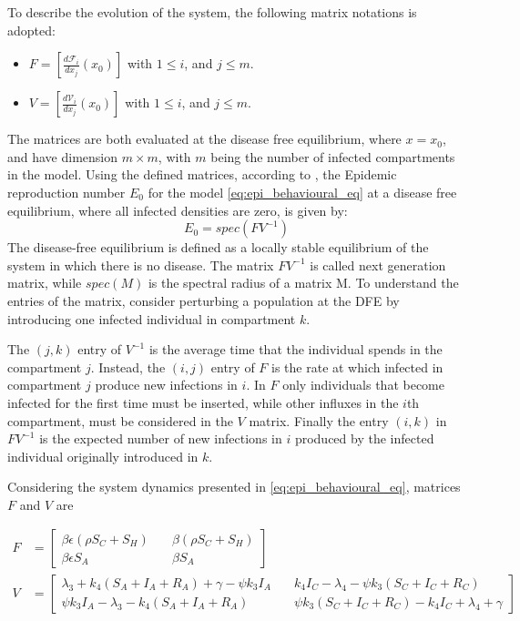 To describe the evolution of the system, the following matrix notations is adopted: 
\begin{itemize}
	\item $F = [\frac{d \mathcal{F}_i}{d x_j}(x_0)]$ with $1 \le i$, and $j \le m$.
	\item $V = [\frac{d \mathcal{V}_i}{d x_j}(x_0)]$ with $1 \le i$, and $j \le m$.	
\end{itemize} 
The matrices are both evaluated at the disease free equilibrium, where $x = x_0$, and have dimension $m \times m$, with $m$ being the number of infected compartments in the model. 
Using the defined matrices, according to \cite{van_den_Driessche_2002,van_den_Driessche_2017}, the Epidemic reproduction number $E_0$ for the model \eqref{eq:epi_behavioural_eq} at a disease free equilibrium, where all infected densities are zero, is given by:
\begin{equation}
E_0 = spec(FV^{-1})
\label{eq:R_0_eqn}
\end{equation}
The disease-free equilibrium is defined as a locally stable equilibrium of the system in which there is no disease.
The matrix $FV^{-1}$ is called next generation matrix, while $spec(M)$ is the spectral radius of a matrix M. To understand the entries of the matrix, consider perturbing a population at the DFE by introducing one infected individual in compartment $k$.

The $(j,k)$ entry of $V^{-1}$ is the average time that the individual spends in the compartment $j$. Instead, the $(i,j)$ entry of $F$ is the  rate at which infected in compartment $j$ produce new infections in $i$. In $F$ only individuals that become infected for the first time must be inserted, while other influxes in the $i$th compartment, must be considered in the $V$ matrix. Finally the entry $(i,k)$  in $FV^{-1}$ is the expected number of new infections in  $i$ produced by the infected individual originally introduced in $k$.

Considering the system dynamics presented in \eqref{eq:epi_behavioural_eq}, matrices $F$ and $V$ are

\begin{align}
F & = 
\begin{bmatrix}
	\beta \epsilon(\rho S_C + S_H) \quad & \beta(\rho S_C + S_H) \\
	\beta \epsilon S_A \quad& \beta S_A
\end{bmatrix} \\
V & = 
\begin{bmatrix}
	\lambda_3+k_4(S_A+I_A+R_A)+\gamma-\psi k_3 I_A \quad & k_4 I_C-\lambda_4-\psi k_3 (S_C+I_C + R_C)  \\
	\psi k_3 I_A - \lambda_3 - k_4 (S_A + I_A + R_A) \quad & \psi k_3 (S_C + I_C + R_C) - k_4 I_C + \lambda_4 + \gamma
\end{bmatrix}
\label{eq:next_gen_matrices}
\end{align}

